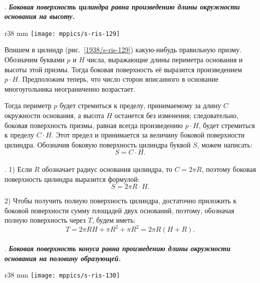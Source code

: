 \paragraph{}\label{1938/s112}
.
\textbf{\emph{Боковая поверхность цилиндра равна произведению длины окружности основания на высоту.}}

\begin{wrapfigure}{r}{38 mm}
\vskip-0mm
\centering
\texttt{[image: mppics/s-ris-129]}
\caption{}\label{1938/s-ris-129}
\vskip-0mm
\end{wrapfigure}

Впишем в цилиндр (рис.~\ref{1938/s-ris-129}) какую-нибудь правильную призму.
Обозначим буквами $p$ и $H$ числа, выражающие длины периметра основания и высоты этой призмы.
Тогда боковая поверхность её выразится произведением $p\cdot H$.
Предположим теперь, что число сторон вписанного в основание многоугольника неограниченно возрастает.

Тогда периметр $p$ будет стремиться к пределу, принимаемому за длину $C$ окружности основания, а высота $H$ останется без изменения;
следовательно, боковая поверхность призмы, равная всегда произведению $p\cdot H$, будет стремиться к пределу $C\cdot H$.
Этот предел и принимается за величину боковой поверхности цилиндра.
Обозначив боковую поверхность цилиндра буквой $S$, можем написать:
\[S = C\cdot H.\]

\paragraph{}\label{1938/s113}
. 1) Если $R$ обозначает радиус основания цилиндра, то $C= 2\pi R$, поэтому боковая поверхность цилиндра выразится формулой:
\[S = 2\pi R \cdot H.\]

2) Чтобы получить полную поверхность цилиндра, достаточно приложить к боковой поверхности сумму площадей двух оснований, поэтому, обозначая полную поверхность через $T$, будем иметь:
\[T= 2\pi RH + \pi R^2 + \pi R^2 = 2\pi R(H + R).\]

\paragraph{}\label{1938/s114}
.
\textbf{\emph{Боковая поверхность конуса равна произведению длины окружности основания на половину образующей.}}

\begin{wrapfigure}{r}{38 mm}
\vskip-0mm
\centering
\texttt{[image: mppics/s-ris-130]}
\caption{}\label{1938/s-ris-130}
\vskip-0mm
\end{wrapfigure}

